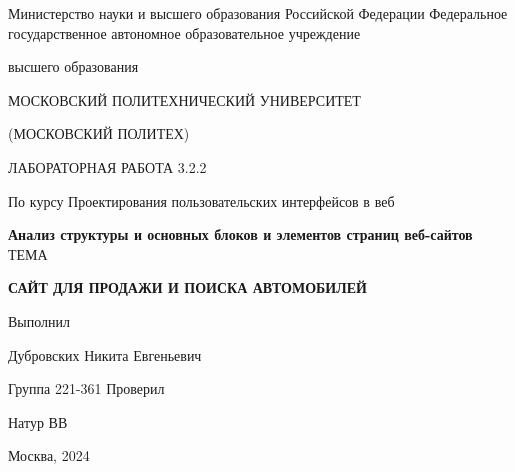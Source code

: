 \singlespacing

\newpage
\begin{center}
    Министерство науки и высшего образования Российской Федерации
    Федеральное государственное автономное образовательное учреждение

    высшего образования

    \guillemotleft МОСКОВСКИЙ ПОЛИТЕХНИЧЕСКИЙ УНИВЕРСИТЕТ\guillemotright

    (МОСКОВСКИЙ ПОЛИТЕХ)
\end{center}
\noindent
\bigbreak
\bigbreak
\bigbreak
\bigbreak
\begin{center}
    ЛАБОРАТОРНАЯ РАБОТА 3.2.2

    По курсу Проектирования пользовательских интерфейсов в веб

    \textbf{Анализ структуры и основных блоков и элементов страниц веб-сайтов}
    \bigbreak
    \bigbreak
    \bigbreak
    \bigbreak
    ТЕМА

    \guillemotleft\textbf{САЙТ ДЛЯ ПРОДАЖИ И ПОИСКА АВТОМОБИЛЕЙ}\guillemotright
\end{center}
\noindent
\bigbreak
\bigbreak
\bigbreak
\bigbreak
\bigbreak
\bigbreak
\bigbreak
\bigbreak
\bigbreak
\bigbreak
\hfill Выполнил

\hfill Дубровских Никита Евгеньевич

\hfill Группа 221-361
\bigbreak
\bigbreak
\bigbreak
\hfill Проверил

\hfill Натур ВВ
\vfill
\begin{center}
    Москва, 2024
\end{center}
\newpage
\onehalfspacing
